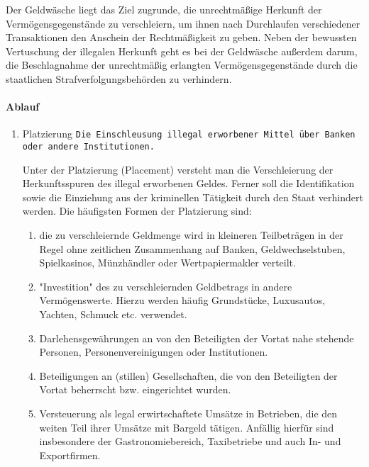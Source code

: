 \documentclass{article}
\begin{document}
	               	Der Geldwäsche liegt das Ziel zugrunde, die unrechtmäßige Herkunft der Vermögensgegenstände zu verschleiern, um ihnen nach Durchlaufen verschiedener Transaktionen den Anschein der Rechtmäßigkeit zu geben.
            		Neben der bewussten Vertuschung der illegalen Herkunft geht es bei der Geldwäsche außerdem darum, die Beschlagnahme der unrechtmäßig erlangten Vermögensgegenstände durch die staatlichen Strafverfolgungsbehörden zu verhindern.

            \paragraph[Ablauf]{Ablauf}
                \begin{enumerate}
                    \item Platzierung
                        \texttt
                            {Die Einschleusung illegal erworbener Mittel über Banken oder andere Institutionen.}

			         Unter der Platzierung (Placement) versteht man die Verschleierung der Herkunftsspuren des illegal erworbenen Geldes. Ferner soll die Identifikation sowie die Einziehung aus der kriminellen Tätigkeit durch den Staat verhindert werden. Die häufigsten Formen der Platzierung sind:
    		         \begin{enumerate}
				        \item
				        	die zu verschleiernde Geldmenge wird in kleineren Teilbeträgen in der Regel ohne zeitlichen Zusammenhang auf Banken, Geldwechselstuben, Spielkasinos, Münzhändler oder Wertpapiermakler verteilt.
        				\item
        					"Investition" des zu verschleiernden Geldbetrags in andere Vermögenswerte. Hierzu werden häufig Grundstücke, Luxusautos, Yachten, Schmuck etc. verwendet.
        				\item
        					Darlehensgewährungen an von den Beteiligten der Vortat nahe stehende Personen, Personenvereinigungen oder Institutionen.
        				\item
        					Beteiligungen an (stillen) Gesellschaften, die von den Beteiligten der Vortat beherrscht bzw. eingerichtet wurden.
        				\item
        					Versteuerung als legal erwirtschaftete Umsätze in Betrieben, die den weiten Teil ihrer Umsätze mit Bargeld tätigen. Anfällig hierfür sind insbesondere der Gastronomiebereich, Taxibetriebe und auch In- und Exportfirmen.
					

\end{enumerate}
\end{enumerate}
\end{document}
